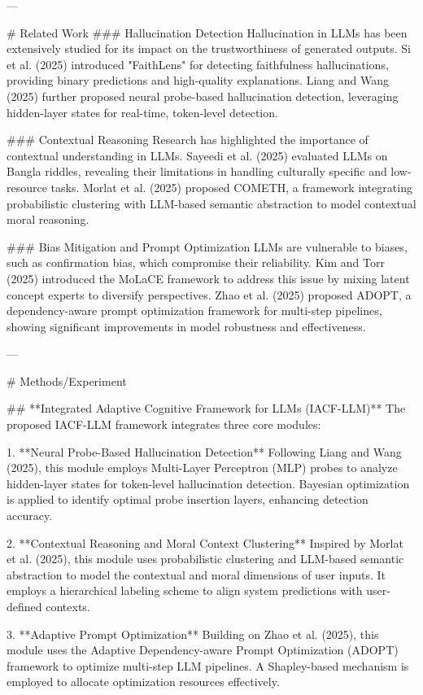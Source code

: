 ---

# Related Work  
### Hallucination Detection  
Hallucination in LLMs has been extensively studied for its impact on the trustworthiness of generated outputs. Si et al. (2025) introduced "FaithLens" for detecting faithfulness hallucinations, providing binary predictions and high-quality explanations. Liang and Wang (2025) further proposed neural probe-based hallucination detection, leveraging hidden-layer states for real-time, token-level detection.

### Contextual Reasoning  
Research has highlighted the importance of contextual understanding in LLMs. Sayeedi et al. (2025) evaluated LLMs on Bangla riddles, revealing their limitations in handling culturally specific and low-resource tasks. Morlat et al. (2025) proposed COMETH, a framework integrating probabilistic clustering with LLM-based semantic abstraction to model contextual moral reasoning.

### Bias Mitigation and Prompt Optimization  
LLMs are vulnerable to biases, such as confirmation bias, which compromise their reliability. Kim and Torr (2025) introduced the MoLaCE framework to address this issue by mixing latent concept experts to diversify perspectives. Zhao et al. (2025) proposed ADOPT, a dependency-aware prompt optimization framework for multi-step pipelines, showing significant improvements in model robustness and effectiveness.

---

# Methods/Experiment  

## **Integrated Adaptive Cognitive Framework for LLMs (IACF-LLM)**  
The proposed IACF-LLM framework integrates three core modules:  

1. **Neural Probe-Based Hallucination Detection**  
   Following Liang and Wang (2025), this module employs Multi-Layer Perceptron (MLP) probes to analyze hidden-layer states for token-level hallucination detection. Bayesian optimization is applied to identify optimal probe insertion layers, enhancing detection accuracy.  

2. **Contextual Reasoning and Moral Context Clustering**  
   Inspired by Morlat et al. (2025), this module uses probabilistic clustering and LLM-based semantic abstraction to model the contextual and moral dimensions of user inputs. It employs a hierarchical labeling scheme to align system predictions with user-defined contexts.  

3. **Adaptive Prompt Optimization**  
   Building on Zhao et al. (2025), this module uses the Adaptive Dependency-aware Prompt Optimization (ADOPT) framework to optimize multi-step LLM pipelines. A Shapley-based mechanism is employed to allocate optimization resources effectively.  


